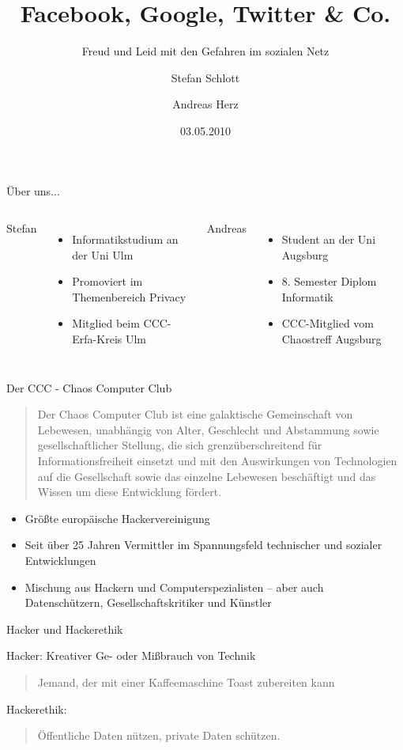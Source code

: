 \documentclass[hyperref={pdfpagelabels=false}]{beamer}
\title{Facebook, Google, Twitter \& Co.}
\subtitle{Freud und Leid mit den Gefahren im sozialen Netz}
\author{%
		Stefan Schlott\inst{1}\and%
		Andreas Herz\inst{2}%
}
\institute{%
	\inst{1}\email{stefan.schlott}{ulm.ccc.de}\and%
	\inst{2}\email{andi}{geekosphere.org}%
}
\date{03.05.2010}
\begin{document}
\begin{frame}[plain]
\titlepage
\end{frame}

\begin{frame}{Über uns...}
	\begin{columns}[t]
			Stefan
			\begin{itemize}
				\item Informatikstudium an der Uni Ulm
				\item Promoviert im Themenbereich Privacy
				\item Mitglied beim CCC-Erfa-Kreis Ulm
			\end{itemize}
			Andreas
			\begin{itemize}
				\item Student an der Uni Augsburg
				\item 8. Semester Diplom Informatik
				\item CCC-Mitglied vom Chaostreff Augsburg
			\end{itemize}
	\end{columns}
	\vfill
\end{frame}

\begin{frame}{Der CCC - Chaos Computer Club}
	\begin{quotation}\small
		Der Chaos Computer Club ist eine galaktische Gemeinschaft von Lebewesen, unabhängig von Alter, Geschlecht und Abstammung sowie gesellschaftlicher Stellung, die sich grenzüberschreitend für Informationsfreiheit einsetzt und mit den Auswirkungen von Technologien auf die Gesellschaft sowie das einzelne Lebewesen beschäftigt und das Wissen um diese Entwicklung fördert.
	\end{quotation}

	\begin{itemize}
		\item Größte europäische Hackervereinigung
		\item Seit über 25 Jahren Vermittler im Spannungsfeld technischer und sozialer Entwicklungen
		\item Mischung aus Hackern und Computerspezialisten -- aber auch Datenschützern, Gesellschaftskritiker und Künstler
	\end{itemize}
\end{frame}

\begin{frame}{Hacker und Hackerethik}
	\begin{block}{Hacker: Kreativer Ge- oder Mißbrauch von Technik}
		\begin{quotation}
			Jemand, der mit einer Kaffeemaschine Toast zubereiten kann
		\end{quotation}
	\end{block}

	\begin{block}{Hackerethik:}
		\begin{quotation}
			Öffentliche Daten nützen, private Daten schützen.
		\end{quotation}
	\end{block}
\end{frame}
\end{document}
